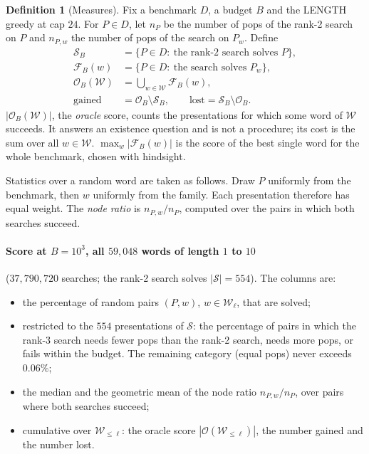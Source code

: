 \documentclass[11pt]{article}
\theoremstyle{definition}
\newtheorem{definition}[theorem]{Definition}
\theoremstyle{remark}
\newcommand{\Sol}{\mathcal{S}}
\newcommand{\Orc}{\mathcal{O}}
\newcommand{\Fix}{\mathcal{F}}
\newcommand{\W}{\mathcal{W}}
\begin{document}
\begin{definition}[Measures]
Fix a benchmark $D$, a budget $B$ and the LENGTH greedy at cap $24$. For $P\in D$, let $n_P$ be the number of pops of
the rank-2 search on $P$ and $n_{P,w}$ the number of pops of the search on $P_w$. Define
\begin{align*}
\Sol_B&=\{P\in D:\ \text{the rank-2 search solves } P\},\\
\Fix_B(w)&=\{P\in D:\ \text{the search solves } P_w\},\\
\Orc_B(\W)&=\textstyle\bigcup_{w\in\W}\Fix_B(w),\\
\text{gained}&=\Orc_B\setminus\Sol_B,\qquad\text{lost}=\Sol_B\setminus\Orc_B.
\end{align*}
$|\Orc_B(\W)|$, the \emph{oracle} score, counts the presentations for which some word of $\W$ succeeds. It answers an
existence question and is not a procedure; its cost is the sum over all $w\in\W$. $\max_{w}|\Fix_B(w)|$ is the score of
the best single word for the whole benchmark, chosen with hindsight.

Statistics over a random word are taken as follows. Draw $P$ uniformly from the benchmark, then $w$ uniformly from the
family. Each presentation therefore has equal weight. The \emph{node ratio} is $n_{P,w}/n_P$, computed over the pairs
in which both searches succeed.
\end{definition}

\paragraph{Score at $B=10^3$, all $59{,}048$ words of length $1$ to $10$} ($37{,}790{,}720$ searches; the rank-2 search
solves $|\Sol|=554$). The columns are:
\begin{itemize}
  \item[(a)] the percentage of random pairs $(P,w)$, $w\in\W_\ell$, that are solved;
  \item[(b)--(d)] restricted to the $554$ presentations of $\Sol$: the percentage of pairs in which the rank-3 search
  needs fewer pops than the rank-2 search, needs more pops, or fails within the budget. The remaining category
  (equal pops) never exceeds $0.06\%$;
  \item[(e), (f)] the median and the geometric mean of the node ratio $n_{P,w}/n_P$, over pairs where both searches
  succeed;
  \item[(g)--(i)] cumulative over $\W_{\le\ell}$: the oracle score $|\Orc(\W_{\le\ell})|$, the number gained and the
  number lost.
\end{itemize}
\end{document}
